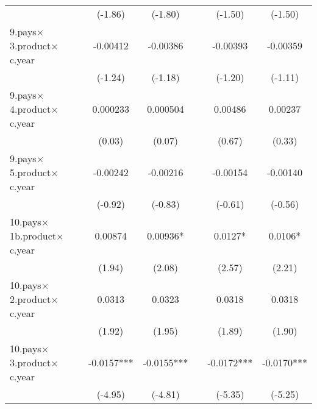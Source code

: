 {\begin{tabular}{l*{6}{c}}
                    &                     &     (-1.86)         &     (-1.80)         &                     &     (-1.50)         &     (-1.50)         \\
[1em]
9.pays$\times$3.product$\times$c.year&                     &    -0.00412         &    -0.00386         &                     &    -0.00393         &    -0.00359         \\
                    &                     &     (-1.24)         &     (-1.18)         &                     &     (-1.20)         &     (-1.11)         \\
[1em]
9.pays$\times$4.product$\times$c.year&                     &    0.000233         &    0.000504         &                     &     0.00486         &     0.00237         \\
                    &                     &      (0.03)         &      (0.07)         &                     &      (0.67)         &      (0.33)         \\
[1em]
9.pays$\times$5.product$\times$c.year&                     &    -0.00242         &    -0.00216         &                     &    -0.00154         &    -0.00140         \\
                    &                     &     (-0.92)         &     (-0.83)         &                     &     (-0.61)         &     (-0.56)         \\
[1em]
10.pays$\times$1b.product$\times$c.year&                     &     0.00874         &     0.00936*  &                     &      0.0127*  &      0.0106*  \\
                    &                     &      (1.94)         &      (2.08)         &                     &      (2.57)         &      (2.21)         \\
[1em]
10.pays$\times$2.product$\times$c.year&                     &      0.0313         &      0.0323         &                     &      0.0318         &      0.0318         \\
                    &                     &      (1.92)         &      (1.95)         &                     &      (1.89)         &      (1.90)         \\
[1em]
10.pays$\times$3.product$\times$c.year&                     &     -0.0157***&     -0.0155***&                     &     -0.0172***&     -0.0170***\\
                    &                     &     (-4.95)         &     (-4.81)         &                     &     (-5.35)         &     (-5.25)         \\

\end{tabular}}
